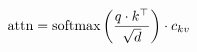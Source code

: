 \documentclass[preview]{article}
\begin{document}
\begin{align*}
\special{dvisvgm:raw <g id='unique000'>}\text{attn} = \text{softmax}\left(\frac{q \cdot k^\top}{\sqrt{d}}\right) \cdot c_{kv}\special{dvisvgm:raw </g>}
\end{align*}
\end{document}
